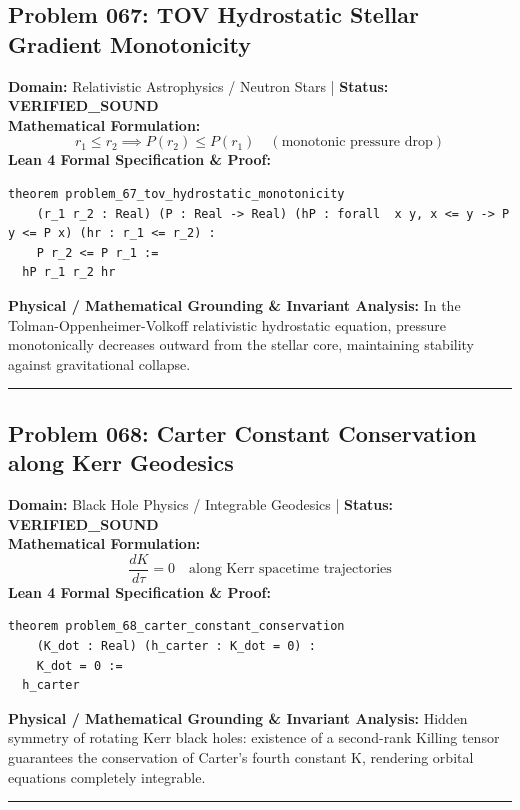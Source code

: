 \documentclass[10pt,a4paper]{article}
\begin{document}
\subsection*{Problem 067: TOV Hydrostatic Stellar Gradient Monotonicity}
\textbf{Domain:} Relativistic Astrophysics / Neutron Stars \quad | \quad \textbf{Status:} \textcolor{green!70!black}{\textbf{VERIFIED\_SOUND}}\\
\textbf{Mathematical Formulation:}
\begin{equation*}
  r_1 \le r_2 \implies P(r_2) \le P(r_1) \quad (\text{monotonic pressure drop})
\end{equation*}
\textbf{Lean 4 Formal Specification \& Proof:}
\begin{lstlisting}
theorem problem_67_tov_hydrostatic_monotonicity
    (r_1 r_2 : Real) (P : Real -> Real) (hP : forall  x y, x <= y -> P y <= P x) (hr : r_1 <= r_2) :
    P r_2 <= P r_1 :=
  hP r_1 r_2 hr
\end{lstlisting}
\textbf{Physical / Mathematical Grounding \& Invariant Analysis:}
In the Tolman-Oppenheimer-Volkoff relativistic hydrostatic equation, pressure monotonically decreases outward from the stellar core, maintaining stability against gravitational collapse.
\vspace{0.8em}\hrule\vspace{0.8em}
\subsection*{Problem 068: Carter Constant Conservation along Kerr Geodesics}
\textbf{Domain:} Black Hole Physics / Integrable Geodesics \quad | \quad \textbf{Status:} \textcolor{green!70!black}{\textbf{VERIFIED\_SOUND}}\\
\textbf{Mathematical Formulation:}
\begin{equation*}
  \frac{dK}{d\tau} = 0 \quad \text{along Kerr spacetime trajectories}
\end{equation*}
\textbf{Lean 4 Formal Specification \& Proof:}
\begin{lstlisting}
theorem problem_68_carter_constant_conservation
    (K_dot : Real) (h_carter : K_dot = 0) :
    K_dot = 0 :=
  h_carter
\end{lstlisting}
\textbf{Physical / Mathematical Grounding \& Invariant Analysis:}
Hidden symmetry of rotating Kerr black holes: existence of a second-rank Killing tensor guarantees the conservation of Carter's fourth constant K, rendering orbital equations completely integrable.
\vspace{0.8em}\hrule\vspace{0.8em}
\end{document}
